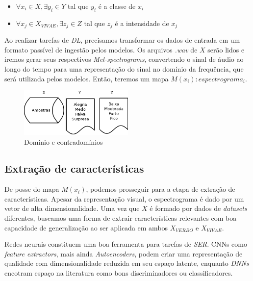 \begin{itemize}
    \item $\forall x_i \in X, \exists y_i \in Y$ tal que  $y_i$ é a classe de $x_i$
    \item $\forall x_j \in X_{VIVAE}, \exists z_j \in Z$ tal que  $z_j$ é a intensidade de $x_j$
\end{itemize}

Ao realizar tarefas de \textit{DL}, precisamos transformar os dados de entrada em um formato passível de ingestão pelos modelos. Os arquivos \textit{.wav} de $X$ serão lidos e iremos gerar seus respectivos \textit{Mel-spectrograms}, convertendo o sinal de áudio ao longo do tempo para uma representação do sinal no domínio da frequência, que será utilizada pelos modelos. Então, teremos um mapa $M(x_i): espectrograma_i$.

\begin{figure}[!h]
\centering
\includegraphics[width=0.5\textwidth]{imagens/p-dominios-contradominos.png}
\caption{\label{fig:dominioscontradominios}Domínio e contradomínios}
\end{figure}

\subsection{Extração de características}

De posse do mapa $M(x_i)$, podemos prosseguir para a etapa de extração de características. Apesar da representação visual, o espectrograma é dado por um vetor de alta dimensionalidade. Uma vez que $X$ é formado por dados de \textit{datasets} diferentes, buscamos uma forma de extrair características relevantes com boa capacidade de generalização ao ser aplicada em ambos $X_{VERBO}$ e $X_{VIVAE}$.

Redes neurais constituem uma boa ferramenta para tarefas de \textit{SER}. CNNs como \textit{feature extractors}, mais ainda \textit{Autoencoders}, podem criar uma representação de qualidade com dimensionalidade reduzida em seu espaço latente, enquanto \textit{DNNs} encotram espaço na literatura como bons discriminadores ou classificadores.

